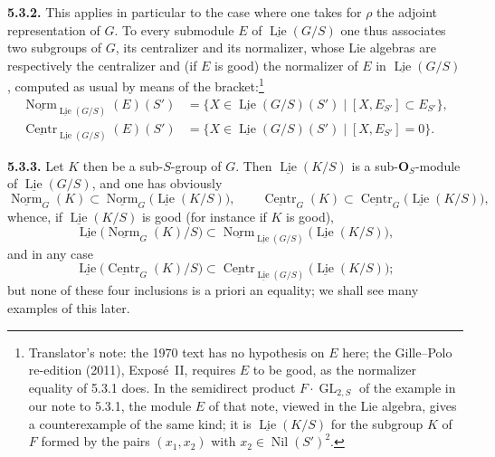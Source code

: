 \medskip
\noindent{}\textbf{5.3.2.}
This applies in particular to the case where one takes for \(\rho\) the
adjoint representation of \(G\). To every submodule \(E\) of
\(\underline{\operatorname{Lie}}(G/S)\) one thus associates two subgroups
of \(G\), its centralizer and its normalizer, whose Lie algebras are
respectively the centralizer and (if \(E\) is good) the normalizer of
\(E\) in \(\underline{\operatorname{Lie}}(G/S)\), computed as usual by
means of the bracket:\footnote{Translator's note: the 1970 text has no
hypothesis on \(E\) here; the Gille--Polo re-edition (2011), Expos\'e~II,
requires \(E\) to be good, as the normalizer equality of 5.3.1 does. In
the semidirect product \(F\cdot\operatorname{GL}_{2,S}\) of the example in
our note to 5.3.1, the module \(E\) of that note, viewed in the Lie algebra,
gives a counterexample of the same kind; it is \(\underline{\operatorname{Lie}}(K/S)\)
for the subgroup \(K\) of \(F\) formed by the pairs \((x_1,x_2)\) with
\(x_2\in\operatorname{Nil}(S')^2\).}
\[
\begin{split}
 \underline{\operatorname{Norm}}_
   {\underline{\operatorname{Lie}}(G/S)}(E)(S')
 &=\{X\in\underline{\operatorname{Lie}}(G/S)(S')
       \mid[X,E_{S'}]\subset E_{S'}\},\\
 \underline{\operatorname{Centr}}_
   {\underline{\operatorname{Lie}}(G/S)}(E)(S')
 &=\{X\in\underline{\operatorname{Lie}}(G/S)(S')
       \mid[X,E_{S'}]=0\}.
\end{split}
\]

\medskip
\noindent{}\textbf{5.3.3.}
Let \(K\) then be a sub-\(S\)-group of \(G\). Then
\(\underline{\operatorname{Lie}}(K/S)\) is a sub-\(\mathbf O_S\)-module of
\(\underline{\operatorname{Lie}}(G/S)\), and one has obviously
\[
 \underline{\operatorname{Norm}}_G(K)
 \subset
 \underline{\operatorname{Norm}}_G
   \bigl(\underline{\operatorname{Lie}}(K/S)\bigr),
 \qquad
 \underline{\operatorname{Centr}}_G(K)
 \subset
 \underline{\operatorname{Centr}}_G
   \bigl(\underline{\operatorname{Lie}}(K/S)\bigr),
\]
whence, if \(\underline{\operatorname{Lie}}(K/S)\) is good (for instance if
\(K\) is good),
\[
 \underline{\operatorname{Lie}}
   \bigl(\underline{\operatorname{Norm}}_G(K)/S\bigr)
 \subset
 \underline{\operatorname{Norm}}_
   {\underline{\operatorname{Lie}}(G/S)}
   \bigl(\underline{\operatorname{Lie}}(K/S)\bigr),
\]
and in any case
\[
 \underline{\operatorname{Lie}}
   \bigl(\underline{\operatorname{Centr}}_G(K)/S\bigr)
 \subset
 \underline{\operatorname{Centr}}_
   {\underline{\operatorname{Lie}}(G/S)}
   \bigl(\underline{\operatorname{Lie}}(K/S)\bigr);
\]
but none of these four inclusions is a priori an equality; we shall see
many examples of this later.

